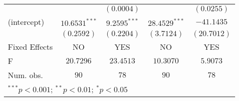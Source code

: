 \begin{table}
\begin{center}
\begin{tabular}{l c c c c}
               &                 & $(0.0004)$      &                   & $(0.0255)$       \\
(intercept)    & $10.6531^{***}$ & $9.2595^{***}$  & $28.4529^{***}$   & $-41.1435$       \\
               & $(0.2592)$      & $(0.2204)$      & $(3.7124)$        & $(20.7012)$      \\
\hline
Fixed Effects  & NO              & YES             & NO                & YES              \\
F              & $20.7296$       & $23.4513$       & $10.3070$         & $5.9073$         \\
Num. obs.      & $90$            & $78$            & $90$              & $78$             \\
\hline
\multicolumn{5}{l}{\scriptsize{$^{***}p<0.001$; $^{**}p<0.01$; $^{*}p<0.05$}}
\end{tabular}
\label{tab:cw_atts}
\end{center}
\end{table}
